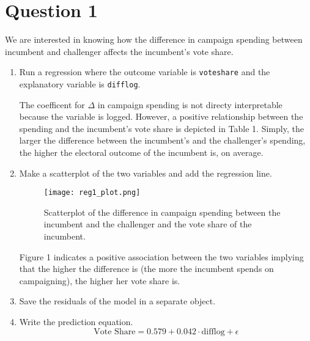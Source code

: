 \documentclass[12pt,letterpaper]{article}
\begin{document}
\section*{Question 1}
\vspace{.25cm}
\noindent We are interested in knowing how the difference in campaign spending between incumbent and challenger affects the incumbent's vote share. 
	\begin{enumerate}
		\item Run a regression where the outcome variable is \texttt{voteshare} and the explanatory variable is \texttt{difflog}.	\vspace{5cm}
		
		
		
		
		The coefficent for $\Delta$ in campaign spending is not directy interpretable because the variable is logged. However, a positive relationship between the spending and the incumbent's vote share is depicted in Table 1. Simply, the larger the difference between the incumbent's and the challenger's spending, the higher the electoral outcome of the incumbent is, on average. 
		
		\item Make a scatterplot of the two variables and add the regression line. 	
		
		
		\begin{figure}[H]
			\centering
			\texttt{[image: reg1\_plot.png]}
			\caption{Scatterplot of the difference in campaign spending between the incumbent and the challenger and the vote share of the incumbent.}
		\end{figure}		
		
		Figure 1 indicates a positive association between the two variables implying that the higher the difference is (the more the incumbent spends on campaigning), the higher her vote share is. 
		
		\item Save the residuals of the model in a separate object.	\\
		
		
		\item Write the prediction equation.
		\begin{equation*}
			\text{Vote Share} = 0.579 + 0.042 \cdot \text{difflog} + \epsilon
		\end{equation*}
		
	\end{enumerate}
	
\end{document}
